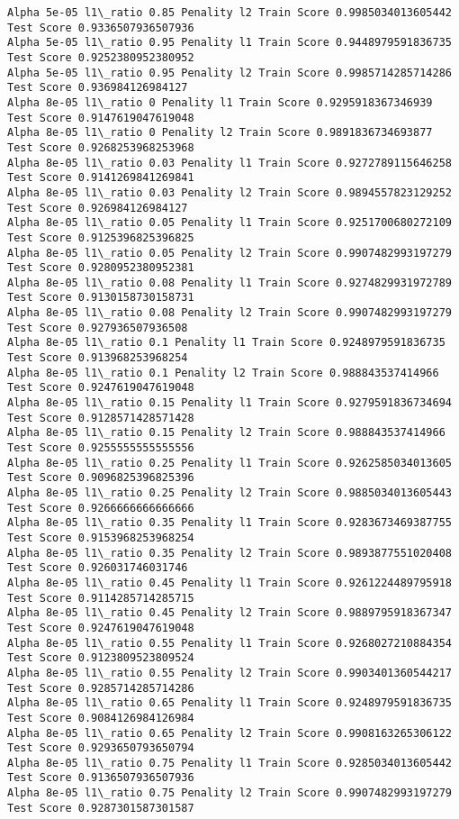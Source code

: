 \documentclass[11pt]{article}
\begin{document}
\begin{Verbatim}[commandchars=\\\{\}]
Alpha 5e-05 l1\_ratio 0.85 Penality l2 Train Score 0.9985034013605442 Test Score 0.9336507936507936
Alpha 5e-05 l1\_ratio 0.95 Penality l1 Train Score 0.9448979591836735 Test Score 0.9252380952380952
Alpha 5e-05 l1\_ratio 0.95 Penality l2 Train Score 0.9985714285714286 Test Score 0.936984126984127
Alpha 8e-05 l1\_ratio 0 Penality l1 Train Score 0.9295918367346939 Test Score 0.9147619047619048
Alpha 8e-05 l1\_ratio 0 Penality l2 Train Score 0.9891836734693877 Test Score 0.9268253968253968
Alpha 8e-05 l1\_ratio 0.03 Penality l1 Train Score 0.9272789115646258 Test Score 0.9141269841269841
Alpha 8e-05 l1\_ratio 0.03 Penality l2 Train Score 0.9894557823129252 Test Score 0.926984126984127
Alpha 8e-05 l1\_ratio 0.05 Penality l1 Train Score 0.9251700680272109 Test Score 0.9125396825396825
Alpha 8e-05 l1\_ratio 0.05 Penality l2 Train Score 0.9907482993197279 Test Score 0.9280952380952381
Alpha 8e-05 l1\_ratio 0.08 Penality l1 Train Score 0.9274829931972789 Test Score 0.9130158730158731
Alpha 8e-05 l1\_ratio 0.08 Penality l2 Train Score 0.9907482993197279 Test Score 0.927936507936508
Alpha 8e-05 l1\_ratio 0.1 Penality l1 Train Score 0.9248979591836735 Test Score 0.913968253968254
Alpha 8e-05 l1\_ratio 0.1 Penality l2 Train Score 0.988843537414966 Test Score 0.9247619047619048
Alpha 8e-05 l1\_ratio 0.15 Penality l1 Train Score 0.9279591836734694 Test Score 0.9128571428571428
Alpha 8e-05 l1\_ratio 0.15 Penality l2 Train Score 0.988843537414966 Test Score 0.9255555555555556
Alpha 8e-05 l1\_ratio 0.25 Penality l1 Train Score 0.9262585034013605 Test Score 0.9096825396825396
Alpha 8e-05 l1\_ratio 0.25 Penality l2 Train Score 0.9885034013605443 Test Score 0.9266666666666666
Alpha 8e-05 l1\_ratio 0.35 Penality l1 Train Score 0.9283673469387755 Test Score 0.9153968253968254
Alpha 8e-05 l1\_ratio 0.35 Penality l2 Train Score 0.9893877551020408 Test Score 0.926031746031746
Alpha 8e-05 l1\_ratio 0.45 Penality l1 Train Score 0.9261224489795918 Test Score 0.9114285714285715
Alpha 8e-05 l1\_ratio 0.45 Penality l2 Train Score 0.9889795918367347 Test Score 0.9247619047619048
Alpha 8e-05 l1\_ratio 0.55 Penality l1 Train Score 0.9268027210884354 Test Score 0.9123809523809524
Alpha 8e-05 l1\_ratio 0.55 Penality l2 Train Score 0.9903401360544217 Test Score 0.9285714285714286
Alpha 8e-05 l1\_ratio 0.65 Penality l1 Train Score 0.9248979591836735 Test Score 0.9084126984126984
Alpha 8e-05 l1\_ratio 0.65 Penality l2 Train Score 0.9908163265306122 Test Score 0.9293650793650794
Alpha 8e-05 l1\_ratio 0.75 Penality l1 Train Score 0.9285034013605442 Test Score 0.9136507936507936
Alpha 8e-05 l1\_ratio 0.75 Penality l2 Train Score 0.9907482993197279 Test Score 0.9287301587301587

\end{Verbatim}
\end{document}
